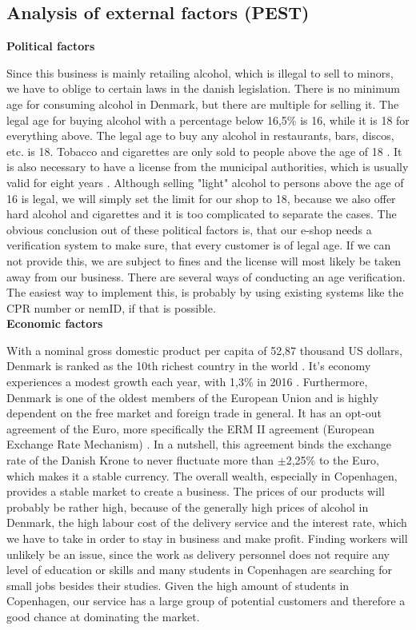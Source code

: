 \documentclass[12p]{article}
\begin{document}
\subsection{Analysis of external factors (PEST)} \label{PEST}

\textbf{Political factors}

Since this business is mainly retailing alcohol, which is illegal to sell to minors, we have to oblige to certain laws in the danish legislation. There is no minimum age for consuming alcohol in Denmark, but there are multiple for selling it. The legal age for buying alcohol with a percentage below 16,5\% is 16, while it is 18 for everything above. The legal age to buy any alcohol in restaurants, bars, discos, etc. is 18. Tobacco and cigarettes are only sold to people above the age of 18 \cite{PEST_AlcoholAndTobaccoLegalAge}. It is also necessary to have a license from the municipal authorities, which is usually valid for eight years \cite{PEST_DenmarkAlcoholLaws}. Although selling "light" alcohol to persons above the age of 16 is legal, we will simply set the limit for our shop to 18, because we also offer hard alcohol and cigarettes and it is too complicated to separate the cases. The obvious conclusion out of these political factors is, that our e-shop needs a verification system to make sure, that every customer is of legal age. If we can not provide this, we are subject to fines and the license will most likely be taken away from our business. There are several ways of conducting an age verification. The easiest way to implement this, is probably by using existing systems like the CPR number or nemID, if that is possible. \\

\textbf{Economic factors}

With a nominal gross domestic product per capita of 52,87 thousand US dollars, Denmark is ranked as the 10th richest country in the world \cite{PEST_NominalGDPPerCapita}. It's economy experiences a modest growth each year, with 1,3\% in 2016 \cite{PEST_CIAFactbookDenmark}. Furthermore, Denmark is one of the oldest members of the European Union and is highly dependent on the free market and foreign trade in general. It has an opt-out agreement of the Euro, more specifically the ERM II agreement (European Exchange Rate Mechanism) \cite{PEST_ERM2}. In a nutshell, this agreement binds the exchange rate of the Danish Krone to never fluctuate more than $\pm$2,25\% to the Euro, which makes it a stable currency. The overall wealth, especially in Copenhagen, provides a stable market to create a business. The prices of our products will probably be rather high, because of the generally high prices of alcohol in Denmark, the high labour cost of the delivery service and the interest rate, which we have to take in order to stay in business and make profit. Finding workers will unlikely be an issue, since the work as delivery personnel does not require any level of education or skills and many students in Copenhagen are searching for small jobs besides their studies. Given the high amount of students in Copenhagen, our service has a large group of potential customers and therefore a good chance at dominating the market. \\
\end{document}
